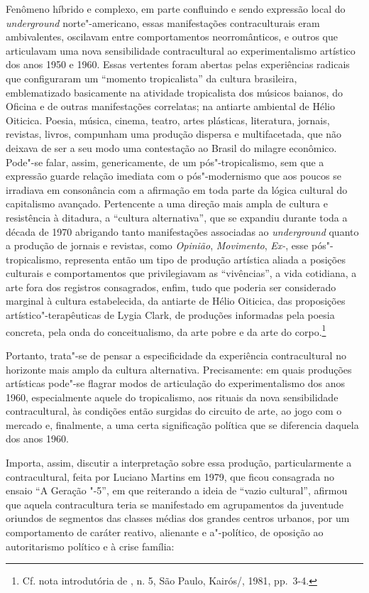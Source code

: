 Fenômeno híbrido e complexo, em parte confluindo e sendo expressão local
do \emph{underground} norte"-americano, essas manifestações
contraculturais eram ambivalentes, oscilavam entre comportamentos
neorromânticos, e outros que articulavam uma nova sensibilidade
contracultural ao experimentalismo artístico dos anos 1950 e 1960. Essas
vertentes foram abertas pelas experiências radicais que configuraram um
``momento tropicalista'' da cultura brasileira, emblematizado
basicamente na atividade tropicalista dos músicos baianos, do Oficina e
de outras manifestações correlatas; na antiarte ambiental de Hélio
Oiticica. Poesia, música, cinema, teatro, artes plásticas, literatura,
jornais, revistas, livros, compunham uma produção dispersa e
multifacetada, que não deixava de ser a seu modo uma contestação ao
Brasil do milagre econômico. Pode"-se falar, assim, genericamente, de um
pós"-tropicalismo, sem que a expressão guarde relação imediata com o
pós"-modernismo que aos poucos se irradiava em consonância com a
afirmação em toda parte da lógica cultural do capitalismo avançado.
Pertencente a uma direção mais ampla de cultura e resistência à
ditadura, a ``cultura alternativa'', que se expandiu durante toda a
década de 1970 abrigando tanto manifestações associadas ao
\emph{underground} quanto a produção de jornais e revistas, como
\emph{Opinião}, \emph{Movimento}, \emph{Ex-}, esse pós"-tropicalismo,
representa então um tipo de produção artística aliada a posições
culturais e comportamentos que privilegiavam as ``vivências'', a vida
cotidiana, a arte fora dos registros consagrados, enfim, tudo que
poderia ser considerado marginal à cultura estabelecida, da antiarte de
Hélio Oiticica, das proposições artístico"-terapêuticas de Lygia Clark,
de produções informadas pela poesia concreta, pela onda do
conceitualismo, da arte pobre e da arte do corpo.\footnote{Cf. nota
introdutória de {}, n. 5, São Paulo, Kairós/, 1981, pp.~3-4.}

Portanto, trata"-se de pensar a especificidade da experiência
contracultural no horizonte mais amplo da cultura alternativa.
Precisamente: em quais produções artísticas pode"-se flagrar modos de
articulação do experimentalismo dos anos 1960, especialmente aquele do
tropicalismo, aos rituais da nova sensibilidade contracultural, às
condições então surgidas do circuito de arte, ao jogo com o mercado e,
finalmente, a uma certa significação política que se diferencia daquela
dos anos 1960.

Importa, assim, discutir a interpretação sobre essa produção,
particularmente a contracultural, feita por Luciano Martins em 1979, que
ficou consagrada no ensaio ``A Geração "-5'', em que reiterando a
ideia de ``vazio cultural'', afirmou que aquela contracultura teria se
manifestado em agrupamentos da juventude oriundos de segmentos das
classes médias dos grandes centros urbanos, por um comportamento de
caráter reativo, alienante e a"-político, de oposição ao autoritarismo
político e à crise família:

